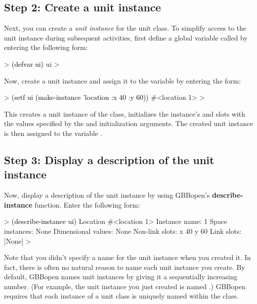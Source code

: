 \documentclass[10pt,twoside,english,pdftex]{article}
\begin{document}
\subsection*{Step 2: Create a unit instance}

%
%
Next, you can create a \textit{unit instance\/} for the 
unit class.  To simplify access to the unit instance during subsequent
activities, first define a global variable called 
by entering the following form:
%
\begin{example}\color{darkergray}%
  > \textcolor{black}{(defvar ui)}
  ui
  >
\end{example}

%
Now, create a unit instance and assign it to the variable  by
entering the form:
%
\begin{example}\color{darkergray}%
  > \textcolor{black}{(setf ui (make-instance 'location :x 40 :y 60))}
  #<location 1>
  >
\end{example}

This creates a unit instance of the  class, initializes the
instance's  and  slots with the values specified by the
 and  initialization arguments.  The created unit instance
is then assigned to the variable .

\subsection*{Step 3: Display a description of the unit instance}

%
%
Now, display a description of the unit instance by using GBBopen's
\textbf{describe-instance} function.  Enter the following form:
%
\begin{example}\color{darkergray}%
  > \textcolor{black}{(describe-instance ui)}
  Location #<location 1>
    Instance name: 1
    Space instances: None
    Dimensional values: None
    Non-link slots:
      x 40
      y 60
    Link slots:
      [None]
  >
\end{example}

Note that you didn't specify a name for the unit instance when you created it.
In fact, there is often no natural reason to name each unit instance you
create. By default, GBBopen names unit instances by giving it a sequentially
increasing number.  (For example, the unit instance you just created is named
.)  GBBopen requires that each instance of a unit class is uniquely
named within the class.
\end{document}
